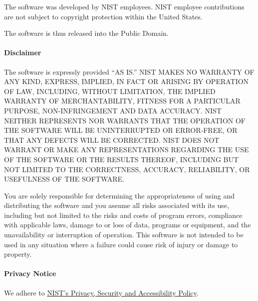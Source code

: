 \documentclass{article}
\begin{document}
The software was developed by NIST employees. NIST employee
contributions are not subject to copyright protection within the
United States.

The software is thus released into the Public Domain.

\paragraph{Disclaimer}
The software is expressly provided ``AS IS.'' NIST MAKES NO WARRANTY OF
ANY KIND, EXPRESS, IMPLIED, IN FACT OR ARISING BY OPERATION OF LAW,
INCLUDING, WITHOUT LIMITATION, THE IMPLIED WARRANTY OF
MERCHANTABILITY, FITNESS FOR A PARTICULAR PURPOSE, NON-INFRINGEMENT
AND DATA ACCURACY. NIST NEITHER REPRESENTS NOR WARRANTS THAT THE
OPERATION OF THE SOFTWARE WILL BE UNINTERRUPTED OR ERROR-FREE, OR THAT
ANY DEFECTS WILL BE CORRECTED. NIST DOES NOT WARRANT OR MAKE ANY
REPRESENTATIONS REGARDING THE USE OF THE SOFTWARE OR THE RESULTS
THEREOF, INCLUDING BUT NOT LIMITED TO THE CORRECTNESS, ACCURACY,
RELIABILITY, OR USEFULNESS OF THE SOFTWARE.

You are solely responsible for determining the appropriateness of
using and distributing the software and you assume all risks
associated with its use, including but not limited to the risks and
costs of program errors, compliance with applicable laws, damage to or
loss of data, programs or equipment, and the unavailability or
interruption of operation. This software is not intended to be used in
any situation where a failure could cause risk of injury or damage to
property.

\paragraph{Privacy Notice}
We adhere to \href{http://www.nist.gov/public_affairs/privacy.cfm}{NIST's Privacy, Security and Accessibility Policy}.
\end{document}
